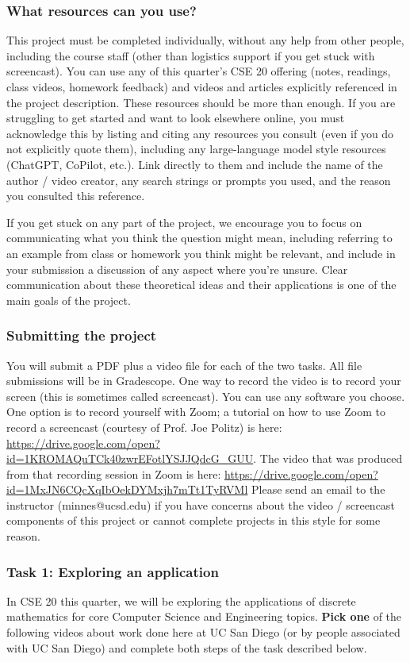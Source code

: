 \documentclass[12pt, oneside]{article}
\begin{document}
\subsubsection*{What resources can you use?} This project must be completed individually, 
without any help from other people, including the course staff (other than logistics support if 
you get stuck with screencast).
You can use any of this quarter's CSE 20 offering (notes, readings, class videos, homework feedback)
and videos and articles explicitly referenced in the project description. 
These resources should be more than enough.
If you are struggling to get started and want to look elsewhere online, 
you must acknowledge this by listing and citing any resources you consult 
(even if you do not explicitly quote them), including any large-language model style resources (ChatGPT, CoPilot, etc.). 
Link directly to them and include the name of the author / video creator, 
any search strings or prompts you used, and the reason you consulted this reference.

If you get stuck on any part of the project, we encourage you to focus on communicating what you think 
the question might mean, including referring to an example from class or homework you think might be relevant, 
and include in your submission a discussion of any aspect where you're unsure. Clear communication about these
theoretical ideas and their applications is one of the main goals of the project.

\subsubsection*{Submitting the project} You will submit a PDF plus a video file for each of the 
two tasks. All file submissions will be in Gradescope. 
One way to record the video is to record your screen (this is sometimes called screencast).
You can use any software you choose. 
One option is to record yourself with Zoom; a tutorial on how to use Zoom to record a 
screencast (courtesy of Prof. Joe Politz)  is here: 
\url{https://drive.google.com/open?id=1KROMAQuTCk40zwrEFotlYSJJQdcG_GUU}.
The video that was produced from that recording session in Zoom is here:
\url{https://drive.google.com/open?id=1MxJN6CQcXqIbOekDYMxjh7mTt1TyRVMl}
Please send an email to the instructor (minnes@ucsd.edu) if you have 
concerns about  the video / screencast components of this project or cannot 
complete projects in this style for some reason.

\subsubsection*{Task 1: Exploring an application}
In CSE 20 this quarter, we will be exploring the applications of discrete mathematics for core Computer
Science and Engineering topics. {\bf Pick one} of the following videos about work done 
here at UC San Diego (or by people associated with UC San Diego) and complete both steps of 
the task described below.
\end{document}
